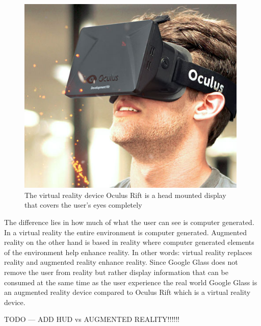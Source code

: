 	\begin{figure}[ht!]
		\centering
		\includegraphics[width=110mm]{images/OculusRift}
		\caption{The virtual reality device Oculus Rift is a head mounted display that covers the user's eyes completely\cite{ImagesOculusRift}}
		\label{OculusRift}
	\end{figure}





The difference lies in how much of what the user can see is computer generated. In a virtual reality the entire environment is computer generated. Augmented reality on the other hand is based in reality where computer generated elements of the environment help enhance reality. In other words: virtual reality replaces reality and augmented reality enhance reality. Since Google Glass does not remove the user from reality but rather display information that can be consumed at the same time as the user experience the real world Google Glass is an augmented reality device compared to Oculus Rift which is a virtual reality device.

TODO --- ADD HUD vs AUGMENTED REALITY!!!!!!


